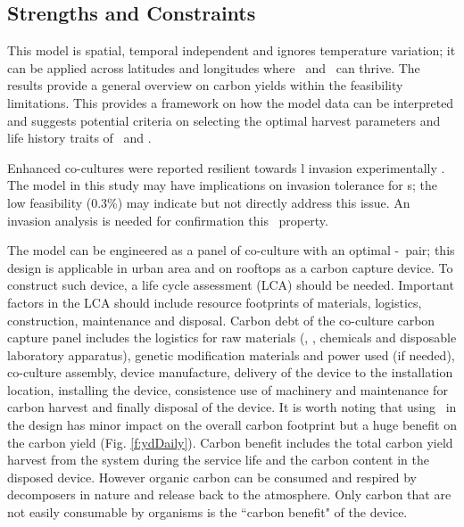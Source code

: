 \documentclass[../thesis.tex]{subfiles} %
\begin{document}
\subsection{Strengths and Constraints}
This model is spatial, temporal independent and ignores temperature variation; it can be applied across latitudes and longitudes where \phy\ and \bac\ can thrive.  The results provide a general overview on carbon yields within the feasibility limitations.  This provides a framework on how the model data can be interpreted and suggests potential criteria on selecting the optimal harvest parameters and life history traits of \phy\ and \bac.

Enhanced co-cultures were reported resilient towards \bac l invasion experimentally \autocite{fuentes2016impact,seyedsayamdost2011roseobacticides}.  The model in this study may have implications on invasion tolerance for \pbs s; the low feasibility (0.3\%) may indicate but not directly address this issue.  An invasion analysis is needed for confirmation this \pbs\ property.

The model can be engineered as a panel of co-culture with an optimal \phy-\bac\ pair; this design is applicable in urban area and on rooftops as a carbon capture device.  To construct such device, a life cycle assessment (LCA) should be needed.  Important factors in the LCA should include resource footprints of materials, logistics, construction, maintenance and disposal.  Carbon debt of the co-culture carbon capture panel includes the logistics for raw materials (\phy, \bac, chemicals and disposable laboratory apparatus), genetic modification materials and power used (if needed), co-culture assembly, device manufacture, delivery of the device to the installation location, installing the device, consistence use of machinery and maintenance for carbon harvest and finally disposal of the device.  It is worth noting that using \bac\ in the design has minor impact on the overall carbon footprint but a huge benefit on the carbon yield (Fig. \ref{f:ydDaily}).  Carbon benefit includes the total carbon yield harvest from the system during the service life and the carbon content in the disposed device.  However organic carbon can be consumed and respired by decomposers in nature and release back to the atmosphere.  Only carbon that are not easily consumable by organisms is the ``carbon benefit" of the device.
\end{document}
